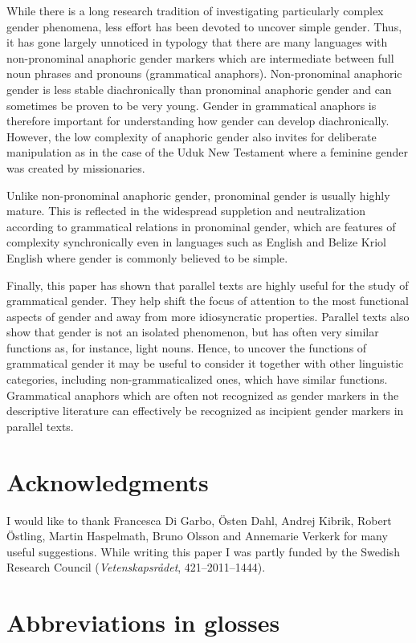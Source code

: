 \documentclass[output=collectionpaper]{langsci/langscibook}
\begin{document}
While there is a long research tradition of investigating particularly complex gender phenomena, less effort has been devoted to uncover simple gender. Thus, it has gone largely unnoticed in typology that there are many languages with non-pronominal anaphoric gender markers which are intermediate between full noun phrases and pronouns (grammatical anaphors). Non-pronominal anaphoric gender is less stable diachronically than pronominal anaphoric gender and can sometimes be proven to be very young. Gender in grammatical anaphors is therefore important for understanding how gender can develop diachronically. However, the low complexity of anaphoric gender also invites for deliberate manipulation as in the case of the Uduk New Testament where a feminine gender was created by missionaries.

Unlike non-pronominal anaphoric gender, pronominal gender is usually highly mature. This is reflected in the widespread suppletion and neutralization according to grammatical relations in pronominal gender, which are features of complexity synchronically even in languages such as English and Belize Kriol English where gender is commonly believed to be simple.

Finally, this paper has shown that parallel texts are highly useful for the study of grammatical gender. They help shift the focus of attention to the most functional aspects of gender and away from more idiosyncratic properties. Parallel texts also show that gender is not an isolated phenomenon, but has often very similar functions as, for instance, light nouns. Hence, to uncover the functions of grammatical gender it may be useful to consider it together with other linguistic categories, including non-grammaticalized ones, which have similar functions. Grammatical anaphors which are often not recognized as gender markers in the descriptive literature can effectively be recognized as incipient gender markers in parallel texts.

\section*{Acknowledgments}

I would like to thank Francesca Di Garbo, Östen Dahl, Andrej Kibrik, Robert Östling, Martin Haspelmath, Bruno Olsson and Annemarie Verkerk for many useful suggestions. While writing this paper I was partly funded by the Swedish Research Council (\textit{Vetenskapsrådet}, 421--2011--1444).

\section*{Abbreviations in glosses}
\end{document}
